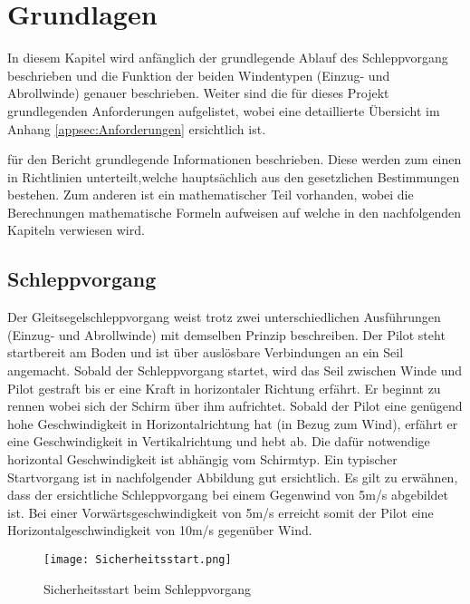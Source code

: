 \section{Grundlagen}\label{sec:Grundlagen}
In diesem Kapitel wird anfänglich der grundlegende Ablauf des Schleppvorgang beschrieben und die Funktion der beiden Windentypen (Einzug- und Abrollwinde) genauer beschrieben. Weiter sind die für dieses Projekt grundlegenden Anforderungen aufgelistet, wobei eine detaillierte Übersicht im Anhang \ref{appsec:Anforderungen} ersichtlich ist.

für den Bericht grundlegende Informationen beschrieben. Diese werden zum einen in Richtlinien unterteilt,welche hauptsächlich aus den gesetzlichen Bestimmungen bestehen. Zum anderen ist ein mathematischer Teil vorhanden, wobei die Berechnungen mathematische Formeln aufweisen auf welche in den nachfolgenden Kapiteln verwiesen wird. 


\subsection{Schleppvorgang}\label{subsec:Schleppvorgang}
Der Gleitsegelschleppvorgang weist trotz zwei unterschiedlichen Ausführungen (Einzug- und Abrollwinde) mit demselben Prinzip beschreiben. Der Pilot steht startbereit am Boden und ist über auslösbare Verbindungen an ein Seil angemacht. Sobald der Schleppvorgang startet, wird das Seil zwischen Winde und Pilot gestraft bis er eine Kraft in horizontaler Richtung erfährt. Er beginnt zu rennen wobei sich der Schirm über ihm aufrichtet. Sobald der Pilot eine genügend hohe Geschwindigkeit in Horizontalrichtung hat (in Bezug zum Wind), erfährt er eine Geschwindigkeit in Vertikalrichtung und hebt ab. Die dafür notwendige horizontal Geschwindigkeit ist abhängig vom Schirmtyp. Ein typischer Startvorgang ist in nachfolgender Abbildung gut ersichtlich. Es gilt zu erwähnen, dass der ersichtliche Schleppvorgang bei einem Gegenwind von 5m/s abgebildet ist. Bei einer Vorwärtsgeschwindigkeit von 5m/s erreicht somit der Pilot eine Horizontalgeschwindigkeit von 10m/s gegenüber Wind.

\begin{figure}[H]
	\begin{center}
		\texttt{[image: Sicherheitsstart.png]}
		\caption{Sicherheitsstart beim Schleppvorgang \cite{Gleitsegelschlepp}}
		\label{fig:Sicherheitsstart}
	\end{center}
\end{figure}


